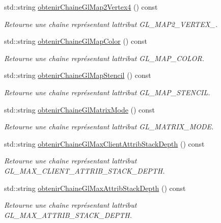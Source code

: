 \begin{DoxyCompactItemize}
std\+::string \hyperlink{group__utilitaire_ga866e31b0b0469c11f0c0bee0bb4f9973}{obtenir\+Chaine\+Gl\+Map2\+Vertex4} () const 
\begin{DoxyCompactList}\small\item\em Retourne une chaîne représentant l\textquotesingle{}attribut G\+L\+\_\+\+M\+A\+P2\+\_\+\+V\+E\+R\+T\+E\+X\+\_. \end{DoxyCompactList}\item 
std\+::string \hyperlink{group__utilitaire_ga7224b43655a9b3d8a381bea11d42d401}{obtenir\+Chaine\+Gl\+Map\+Color} () const 
\begin{DoxyCompactList}\small\item\em Retourne une chaîne représentant l\textquotesingle{}attribut G\+L\+\_\+\+M\+A\+P\+\_\+\+C\+O\+L\+O\+R. \end{DoxyCompactList}\item 
std\+::string \hyperlink{group__utilitaire_ga17a6e4887be554b1845d8eb595129b0c}{obtenir\+Chaine\+Gl\+Map\+Stencil} () const 
\begin{DoxyCompactList}\small\item\em Retourne une chaîne représentant l\textquotesingle{}attribut G\+L\+\_\+\+M\+A\+P\+\_\+\+S\+T\+E\+N\+C\+I\+L. \end{DoxyCompactList}\item 
std\+::string \hyperlink{group__utilitaire_ga3cb5f2ef622bebc2786449eda2460d55}{obtenir\+Chaine\+Gl\+Matrix\+Mode} () const 
\begin{DoxyCompactList}\small\item\em Retourne une chaîne représentant l\textquotesingle{}attribut G\+L\+\_\+\+M\+A\+T\+R\+I\+X\+\_\+\+M\+O\+D\+E. \end{DoxyCompactList}\item 
std\+::string \hyperlink{group__utilitaire_ga2085416ccd06cb60bc98ba2207174dd1}{obtenir\+Chaine\+Gl\+Max\+Client\+Attrib\+Stack\+Depth} () const 
\begin{DoxyCompactList}\small\item\em Retourne une chaîne représentant l\textquotesingle{}attribut G\+L\+\_\+\+M\+A\+X\+\_\+\+C\+L\+I\+E\+N\+T\+\_\+\+A\+T\+T\+R\+I\+B\+\_\+\+S\+T\+A\+C\+K\+\_\+\+D\+E\+P\+T\+H. \end{DoxyCompactList}\item 
std\+::string \hyperlink{group__utilitaire_gaa03eca9a37a755a11183714292f89779}{obtenir\+Chaine\+Gl\+Max\+Attrib\+Stack\+Depth} () const 
\begin{DoxyCompactList}\small\item\em Retourne une chaîne représentant l\textquotesingle{}attribut G\+L\+\_\+\+M\+A\+X\+\_\+\+A\+T\+T\+R\+I\+B\+\_\+\+S\+T\+A\+C\+K\+\_\+\+D\+E\+P\+T\+H. \end{DoxyCompactList}\item 

\end{DoxyCompactItemize}
